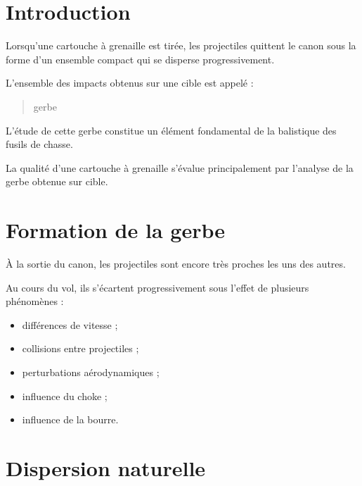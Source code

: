 
\section{Introduction}

Lorsqu'une cartouche à grenaille est tirée, les projectiles quittent le canon
sous la forme d'un ensemble compact qui se disperse progressivement.

L'ensemble des impacts obtenus sur une cible est appelé :

\begin{quote}
gerbe
\end{quote}

L'étude de cette gerbe constitue un élément fondamental de la balistique des
fusils de chasse.

\begin{aretenir}

La qualité d'une cartouche à grenaille s'évalue principalement par l'analyse
de la gerbe obtenue sur cible.

\end{aretenir}

\section{Formation de la gerbe}

À la sortie du canon, les projectiles sont encore très proches les uns des
autres.

Au cours du vol, ils s'écartent progressivement sous l'effet de plusieurs
phénomènes :

\begin{itemize}
    \item différences de vitesse ;
    \item collisions entre projectiles ;
    \item perturbations aérodynamiques ;
    \item influence du choke ;
    \item influence de la bourre.
\end{itemize}

\section{Dispersion naturelle}

